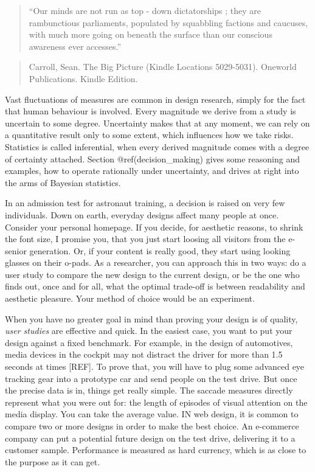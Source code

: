 \documentclass[]{svmono}
\begin{document}
\begin{quote}
``Our minds are not run as top - down dictatorships ; they are
rambunctious parliaments, populated by squabbling factions and caucuses,
with much more going on beneath the surface than our conscious awareness
ever accesses.''
\end{quote}

\begin{quote}
Carroll, Sean. The Big Picture (Kindle Locations 5029-5031). Oneworld
Publications. Kindle Edition.
\end{quote}

Vast fluctuations of measures are common in design research, simply for
the fact that human behaviour is involved. Every magnitude we derive
from a study is uncertain to some degree. Uncertainty makes that at any
moment, we can rely on a quantitative result only to some extent, which
influences how we take risks. Statistics is called inferential, when
every derived magnitude comes with a degree of certainty attached.
Section @ref(decision\_making) gives some reasoning and examples, how to
operate rationally under uncertainty, and drives at right into the arms
of Bayesian statistics.

In an admission test for astronaut training, a decision is raised on
very few individuals. Down on earth, everyday designs affect many people
at once. Consider your personal homepage. If you decide, for aesthetic
reasons, to shrink the font size, I promise you, that you just start
loosing all visitors from the e-senior generation. Or, if your content
is really good, they start using looking glasses on their o-pads. As a
researcher, you can approach this in two ways: do a user study to
compare the new design to the current design, or be the one who finds
out, once and for all, what the optimal trade-off is between readability
and aesthetic pleasure. Your method of choice would be an experiment.

When you have no greater goal in mind than proving your design is of
quality, \emph{user studies} are effective and quick. In the easiest
case, you want to put your design against a fixed benchmark. For
example, in the design of automotives, media devices in the cockpit may
not distract the driver for more than 1.5 seconds at times {[}REF{]}. To
prove that, you will have to plug some advanced eye tracking gear into a
prototype car and send people on the test drive. But once the precise
data is in, things get really simple. The saccade measures directly
represent what you were out for: the length of episodes of visual
attention on the media display. You can take the average value. IN web
design, it is common to compare two or more designs in order to make the
best choice. An e-commerce company can put a potential future design on
the test drive, delivering it to a customer sample. Performance is
measured as hard currency, which is as close to the purpose as it can
get.
\end{document}
